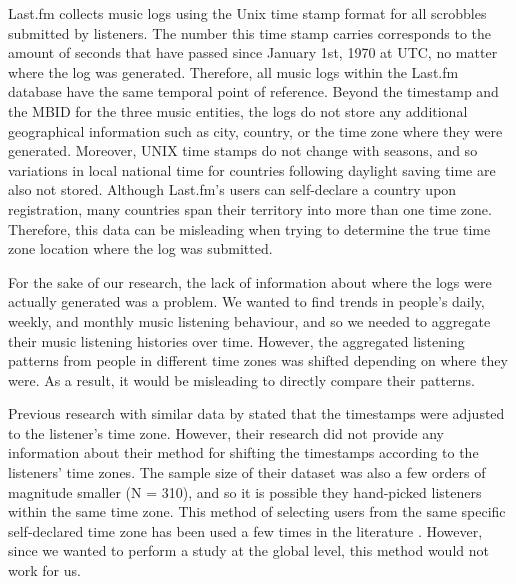 Last.fm collects music logs using the Unix time stamp format for all scrobbles submitted by listeners. The number this time stamp carries corresponds to the amount of seconds that have passed since January 1st, 1970 at UTC, no matter where the log was generated.
Therefore, all music logs within the Last.fm database have the same temporal point of reference. Beyond the timestamp and the MBID for the three music entities, the logs do not store any additional geographical information such as city, country, or the time zone where they were generated.
Moreover, UNIX time stamps do not change with seasons, and so variations in local national time for countries following daylight saving time are also not stored. 
Although Last.fm's users can self-declare a country upon registration, many countries span their territory into more than one time zone. Therefore, this data can be misleading when trying to determine the true time zone location where the log was submitted.

For the sake of our research, the lack of information about where the logs were actually generated was a problem. We wanted to find trends in people's daily, weekly, and monthly music listening behaviour, and so we needed to aggregate their music listening histories over time. However, the aggregated listening patterns from people in different time zones was shifted depending on where they were. As a result, it would be misleading to directly compare their patterns.

Previous research with similar data by \textcite{baur12listening} stated that the timestamps were adjusted to the listener's time zone. However, their research did not provide any information about their method for shifting the timestamps according to the listeners' time zones. The sample size of their dataset was also a few orders of magnitude smaller (N = 310), and so it is possible they hand-picked listeners within the same time zone. This method of selecting users from the same specific self-declared time zone has been used a few times in the literature \autocite{berkers10gendered, buttgen10thesis,park10temporal}. However, since we wanted to perform a study at the global level, this method would not work for us.


